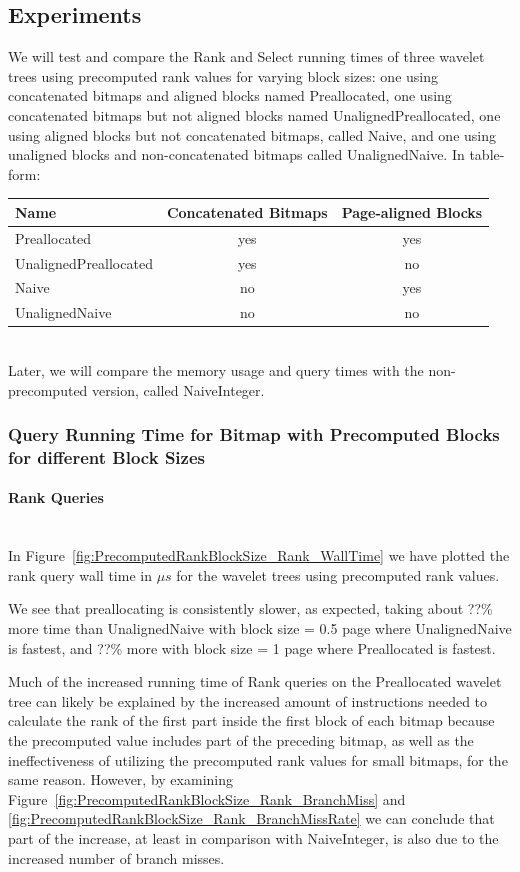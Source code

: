 \subsection{Experiments}
We will test and compare the Rank and Select running times of three wavelet trees using precomputed rank values for varying block sizes: one using concatenated bitmaps and aligned blocks named Preallocated, one using concatenated bitmaps but not aligned blocks named UnalignedPreallocated, one using aligned blocks but not concatenated bitmaps, called Naive,
and one using unaligned blocks and non-concatenated bitmaps called UnalignedNaive.
In table-form:\\
\begin{tabular}{|lcc|}
\hline
Name						& Concatenated Bitmaps	& Page-aligned Blocks	\\ \hline
Preallocated				& yes					& yes					\\ \hline
UnalignedPreallocated	& yes					& no						\\ \hline
Naive					& no						& yes					\\ \hline
UnalignedNaive			& no						& no						\\ \hline
\end{tabular}\\
Later, we will compare the memory usage and query times with the non-precomputed version, called NaiveInteger.

\subsubsection{Query Running Time for Bitmap with Precomputed Blocks for different Block Sizes}
\label{sec:queryRunTimePrecomputedBlockSizes}

\paragraph{Rank Queries}~\\
In Figure~\ref{fig:PrecomputedRankBlockSize_Rank_WallTime} we have plotted the rank query wall time in $\mu s$ for the wavelet trees using precomputed rank values.

We see that preallocating is consistently slower, as expected, taking about ??\% more time than UnalignedNaive with block size = 0.5 page where UnalignedNaive is fastest, and ??\% more with block size = 1 page where Preallocated is fastest.

Much of the increased running time of Rank queries on the Preallocated wavelet tree can likely be explained by the increased amount of instructions needed to calculate the rank of the first part inside the first block of each bitmap because the precomputed value includes part of the preceding bitmap, as well as the ineffectiveness of utilizing the precomputed rank values for small bitmaps, for the same reason.
However, by examining Figure~\ref{fig:PrecomputedRankBlockSize_Rank_BranchMiss} and \ref{fig:PrecomputedRankBlockSize_Rank_BranchMissRate} we can conclude that part of the increase, at least in comparison with NaiveInteger, is also due to the increased number of branch misses.

